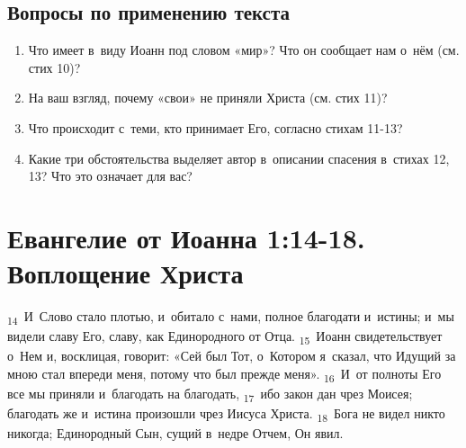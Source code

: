 \documentclass[a4paper,12pt]{article}
\begin{document}
\subsection*{Вопросы по применению текста} 
\begin{enumerate}
    \item Что имеет в~виду Иоанн под словом «мир»? Что он сообщает нам о~нём (см. стих 10)? 
    
    \myline
    
    \myline

    \item На ваш взгляд, почему «свои» не приняли Христа (см. стих 11)? 
    
    \myline
    
    \myline

    \item Что происходит с~теми, кто принимает Его, согласно стихам 11-13? 
    
    \myline
    
    \myline

    \item Какие три обстоятельства выделяет автор в~описании спасения в~стихах 12, 13? Что это означает для вас?
    
    \myline
    
    \myline

\end{enumerate}



\section{Евангелие от Иоанна 1:14-18. Воплощение Христа}

\textsubscript{14}~И~Слово стало плотью, и~обитало с~нами, полное благодати и~истины; и~мы видели славу Его, славу, как Единородного от Отца. \textsubscript{15}~Иоанн свидетельствует о~Нем и, восклицая, говорит: «Сей был Тот, о~Котором я~сказал, что Идущий за мною стал впереди меня, потому что был прежде меня». \textsubscript{16}~И~от полноты Его все мы приняли и~благодать на благодать, \textsubscript{17}~ибо закон дан чрез Моисея; благодать же и~истина произошли чрез Иисуса Христа. \textsubscript{18}~Бога не видел никто никогда; Единородный Сын, сущий в~недре Отчем, Он явил.
\end{document}
